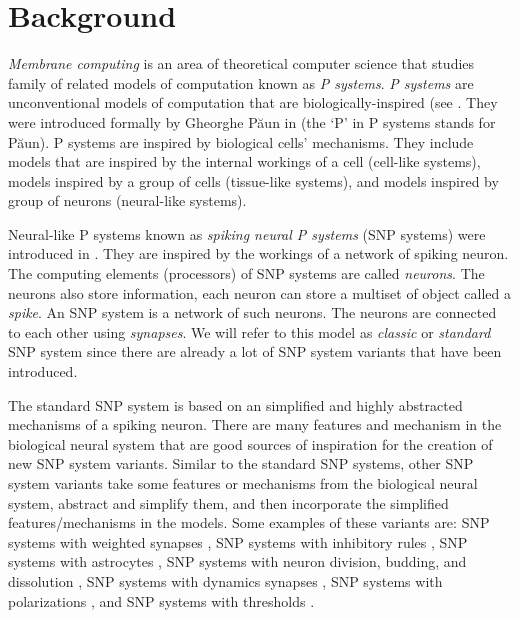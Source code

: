 \documentclass[smallextended]{svjour3}
\begin{document}

\section{Background}

\textit{Membrane computing} is an area of theoretical computer science that studies family of related models of computation known as \textit{P systems}.
\textit{P systems} are unconventional models of computation that are biologically-inspired (see \cite{HANDBOOK}. They were introduced formally by 
Gheorghe P\u{a}un in \cite{mc} (the `P' in P systems stands for P\u{a}un). P systems are inspired by biological cells' mechanisms. They include models
that are inspired by the internal workings of a cell (cell-like systems), models inspired by a group of cells (tissue-like systems), and models inspired 
by group of neurons (neural-like systems).

Neural-like P systems known as \textit{spiking neural P systems} (SNP systems) were introduced in
\cite{ionescu-2006-snp}. They are inspired by the workings of a network of spiking neuron. The 
computing elements (processors) of SNP systems are called \textit{neurons}. The neurons also store 
information, each neuron can store a multiset of object called a \textit{spike}. An SNP system is a 
network of such neurons. The neurons are connected to each other using \textit{synapses}. We 
 will refer to this model as \textit{classic} or \textit{standard} SNP system since there 
are already a lot of SNP system variants that have been introduced.

The standard SNP system is based on an simplified and highly abstracted mechanisms of a spiking 
neuron. There are many features and mechanism in the biological neural system that are good sources
of inspiration for the creation of new SNP system variants. Similar to the standard SNP systems, 
other SNP system variants take some features or mechanisms from the biological neural system, 
abstract and simplify them, and then incorporate the simplified features/mechanisms in the models.
Some examples of these variants are: SNP systems with weighted synapses \cite{wang-2010-weights}
\cite{pan-2012-weighted-synapses}, SNP systems with inhibitory rules \cite{peng-2019-inhibitory-rules},
SNP systems with astrocytes \cite{paun-2007-astrocyte-like} \cite{pan-2012-astrocytes}, SNP systems
with neuron division, budding, and dissolution \cite{wang-2011-neuron-division,pan-2011-division-budding,zhao-2016-division-dissolution}, 
SNP systems with dynamics synapses \cite{cabarle-2015-structural-plasticity,cabarle-2017-scheduled-synapses},
SNP systems with polarizations \cite{wu-2018-polarizations}, and SNP systems with thresholds
\cite{zeng-2014-thresholds}.
\end{document}
